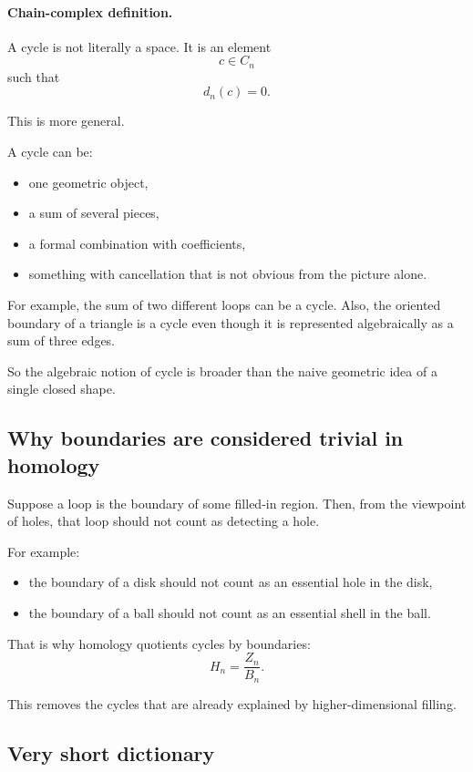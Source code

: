 \documentclass[12pt,a4paper]{article}
\theoremstyle{notespace}
\begin{document}
\paragraph{Chain-complex definition.}
A cycle is not literally a space. It is an element
\[
c\in C_n
\]
such that
\[
d_n(c)=0.
\]

This is more general.

A cycle can be:

\begin{itemize}
	\item one geometric object,
	\item a sum of several pieces,
	\item a formal combination with coefficients,
	\item something with cancellation that is not obvious from the picture alone.
\end{itemize}

For example, the sum of two different loops can be a cycle. Also, the oriented boundary of a triangle is a cycle even though it is represented algebraically as a sum of three edges.

So the algebraic notion of cycle is broader than the naive geometric idea of a single closed shape.

\subsection{ Why boundaries are considered trivial in homology}

Suppose a loop is the boundary of some filled-in region. Then, from the viewpoint of holes, that loop should not count as detecting a hole.

For example:

\begin{itemize}
	\item the boundary of a disk should not count as an essential hole in the disk,
	\item the boundary of a ball should not count as an essential shell in the ball.
\end{itemize}

That is why homology quotients cycles by boundaries:
\[
H_n=\frac{Z_n}{B_n}.
\]

This removes the cycles that are already explained by higher-dimensional filling.

\subsection{Very short dictionary}
\end{document}
